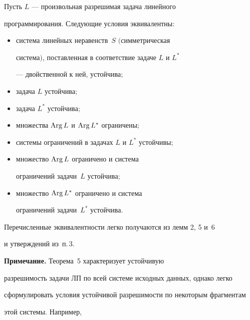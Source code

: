 \begin{thm}


Пусть $L$ --- произвольная разрешимая задача линейного


программирования. Следующие условия эквивалентны\/$:$


\begin{itemize}


\item[$1^0.$] система линейных неравенств~$S$ $($симметрическая


система$)$, поставленная в соответствие задаче $L$ и $L^*$


--- двойственной к ней, устойчива\/$;$


\item[$2^0.$] задача $L$ устойчива\/$;$


\item[$3^0.$] задача $L^*$ устойчива\/$;$


\item[$4^0.$] множества $\operatorname{Arg} L$ и $\operatorname{Arg} L^*$ ограничены\/$;$


\item[$5^0.$] системы ограничений в задачах $L$ и $L^*$ устойчивы\/$;$


\item[$6^0.$] множество $\operatorname{Arg} L$ ограничено и система


ограничений задачи~$L$ устойчива\/$;$


\item[$7^0.$] множество $\operatorname{Arg} L^*$ ограничено и система


ограничений задачи~$L^*$ устойчива.


\end{itemize}


\end{thm}





Перечисленные эквивалентности легко получаются из лемм 2, 5 и~6


и утверждений из~п.\,3.


\medskip





{\bf Примечание.} Теорема~5 характеризует устойчивую


разрешимость задачи ЛП по всей системе исходных данных, однако легко


сформулировать условия устойчивой разрешимости по некоторым фрагментам


этой системы. Например,



